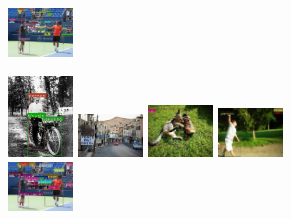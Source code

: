 \documentclass[letterpaper]{article}
\begin{document}
\begin{figure}[h]
\begin{subfigure}{\textwidth}
        \includegraphics[width = 0.19\textwidth, height = 0.25\textwidth]{Images/Yolo-MS-COCO-original/det_test5.jpg}
    \end{subfigure}
    \begin{subfigure}{\textwidth}
        \includegraphics[width = 0.19\textwidth, height = 0.25\textwidth]{Images/Yolo-MS-COCO-Attacked/det_att_test1.jpg}
        \includegraphics[width = 0.19\textwidth, height = 0.25\textwidth]{Images/Yolo-MS-COCO-Attacked/det_att_test2.jpg}
        \includegraphics[width = 0.19\textwidth, height = 0.25\textwidth]{Images/Yolo-MS-COCO-Attacked/det_att_test3.jpg}
        \includegraphics[width = 0.19\textwidth, height = 0.25\textwidth]{Images/Yolo-MS-COCO-Attacked/det_att_test4.jpg}
        \includegraphics[width = 0.19\textwidth, height = 0.25\textwidth]{Images/Yolo-MS-COCO-Attacked/det_att_test5.jpg}

\end{subfigure}
\end{figure}
\end{document}
